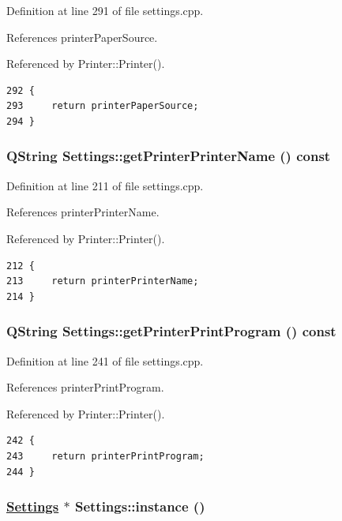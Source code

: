 Definition at line 291 of file settings.cpp.

References printer\-Paper\-Source.

Referenced by Printer::Printer().

\footnotesize\begin{verbatim}292 {
293     return printerPaperSource;
294 }
\end{verbatim}\normalsize 


\hypertarget{classSettings_a19}{
\subsubsection[getPrinterPrinterName]{\setlength{\rightskip}{0pt plus 5cm}QString Settings::get\-Printer\-Printer\-Name () const}}
\label{classSettings_a19}


Definition at line 211 of file settings.cpp.

References printer\-Printer\-Name.

Referenced by Printer::Printer().

\footnotesize\begin{verbatim}212 {
213     return printerPrinterName;
214 }
\end{verbatim}\normalsize 


\hypertarget{classSettings_a25}{
\subsubsection[getPrinterPrintProgram]{\setlength{\rightskip}{0pt plus 5cm}QString Settings::get\-Printer\-Print\-Program () const}}
\label{classSettings_a25}


Definition at line 241 of file settings.cpp.

References printer\-Print\-Program.

Referenced by Printer::Printer().

\footnotesize\begin{verbatim}242 {
243     return printerPrintProgram;
244 }
\end{verbatim}\normalsize 


\hypertarget{classSettings_e0}{
\subsubsection[instance]{\setlength{\rightskip}{0pt plus 5cm}\hyperlink{classSettings}{Settings} $\ast$ Settings::instance ()}}
\label{classSettings_e0}



